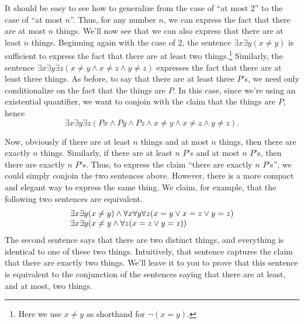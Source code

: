 It should be easy to see how to generalize from the case of ``at most
2'' to the case of ``at most $n$''.  Thus, for any number $n$, we can
express the fact that there are at most $n$ things.  We'll now see
that we can also express that there are at least $n$ things.
Beginning again with the case of $2$, the sentence
$\exists x\exists y(x\neq y)$ is sufficient to express the fact that
there are at least two things.\footnote{Here we use $x\neq y$ as
  shorthand for $\neg (x=y)$.}  Similarly, the sentence
$\exists x\exists y\exists z(x\neq y\wedge x\neq z\wedge y\neq z)$
expresses the fact that there are at least three things.  As before,
to say that there are at least three $P$'s, we need only
conditionalize on the fact that the things are $P$.  In this case,
since we're using an existential quantifier, we want to conjoin with
the claim that the things are $P$, hence
\[ \exists x\exists y\exists z(Px\wedge Py\wedge Pz\wedge x\neq
  y\wedge x\neq z\wedge y\neq z )  . \]

Now, obviously if there are at least $n$ things and at most $n$
things, then there are exactly $n$ things.  Similarly, if there are at
least $n$ $P$'s and at most $n$ $P$'s, then there are exactly $n$
$P$'s.  Thus, to express the claim ``there are exactly $n$ $P$'s'', we
could simply conjoin the two sentences above.  However, there is a
more compact and elegant way to express the same thing.  We claim, for
example, that the following two sentences are equivalent.
\[ \begin{array}{l l}
\exists x\exists y(x\neq y)\wedge \forall x\forall y\forall z(x=y\vee
     x=z\vee y=z) \\
\exists x\exists y(x\neq y\wedge \forall z(x=z\vee y=z))      
   \end{array} \]
 The second sentence says that there are two distinct things, and
 everything is identical to one of these two things.  Intuitively, that
 sentence captures the claim that there  are exactly two
 things.  We'll leave it to you to prove that this sentence is
 equivalent to the conjunction of the sentences saying that there are
 at least, and at most, two things.
                           
